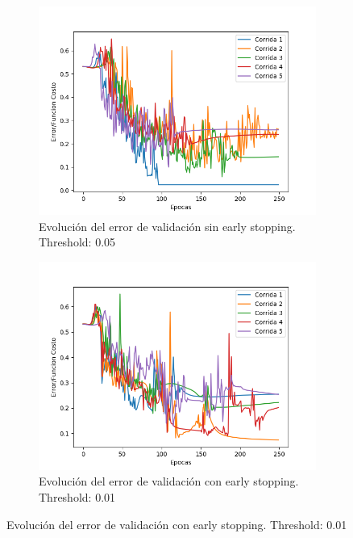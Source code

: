 \begin{figure}[!htbp]
\centering
\begin{subfigure}{.5\textwidth}
  \centering
  \includegraphics[width=1\linewidth]{graficos/early_stopping_validacion_0_05.png}
  \caption{Evolución del error de validación sin early stopping. Threshold: 0.05}
  \label{fig:sub1}
\end{subfigure}%
\begin{subfigure}{.5\textwidth}
  \centering
  \includegraphics[width=1\linewidth]{graficos/early_stopping_validacion_0_01.png}
  \caption{Evolución del error de validación con early stopping. Threshold: 0.01}
  \label{fig:sub2}
\end{subfigure}
\end{figure}

